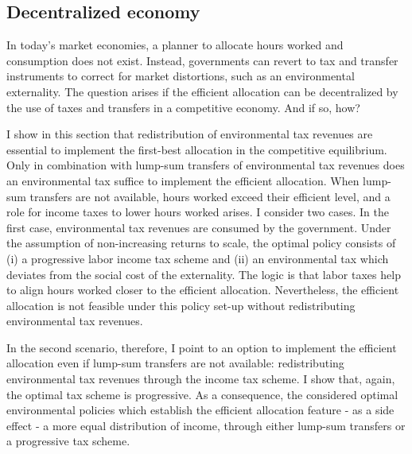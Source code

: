 \subsection{Decentralized economy}\label{subsec:decen_ec}

In today's market economies, a planner to allocate hours worked and consumption does not exist. Instead, governments can revert to tax and transfer instruments to correct for market distortions, such as an environmental externality. The question arises if the efficient allocation can be decentralized by the use of taxes and transfers in a competitive economy. And if so, how? %

I show in this section that redistribution of environmental tax revenues are essential to implement the first-best allocation in the competitive equilibrium. Only in combination with lump-sum transfers of  environmental tax revenues does an environmental tax suffice to implement the efficient allocation. %
When lump-sum transfers are not available, hours worked exceed their efficient level, and a role for income taxes to lower hours worked arises. I consider two cases.
In the first case, environmental tax revenues are consumed by the government. Under the assumption of non-increasing returns to scale, the optimal policy consists of (i) a progressive labor income tax scheme and (ii) an environmental tax which deviates from the social cost of the externality. The logic is that labor taxes help to align hours worked closer to the efficient allocation. 
Nevertheless, the efficient allocation is not feasible under this policy set-up without redistributing environmental tax revenues.

In the second scenario, therefore, I point to an option to implement the efficient allocation even if lump-sum transfers are not available: redistributing environmental tax revenues through the income tax scheme.
 I show that, again, the optimal tax scheme is progressive. 
As a consequence, the considered optimal environmental policies which establish the efficient allocation feature - as a side effect - a more equal distribution of income, through either lump-sum transfers or a progressive tax scheme.%


